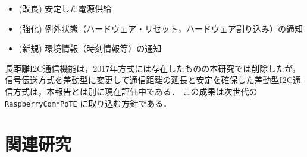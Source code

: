 \begin{itemize}
\item (改良) 安定した電源供給
\item (強化) 例外状態（ハードウェア・リセット，ハードウェア割り込み）の通知
\item (新規) 環境情報（時刻情報等）の通知
\end{itemize}

長距離I2C通信機能は，2017年方式には存在したものの本研究では削除したが，信号伝送方式を差動型に変更して通信距離の延長と安定を確保した差動型I2C通信方式は，本報告とは別に現在評価中である．
この成果は次世代の {\tt Raspberry\-Com*PoTE} に取り込む方針である．





\section{関連研究}
\label{sec:03relatedworks}

